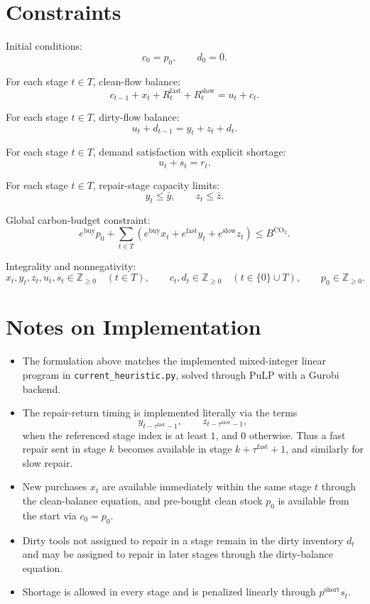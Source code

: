 \section*{Constraints}

Initial conditions:
\[
c_0 = p_0,
\qquad
d_0 = 0.
\]

For each stage $t\in T$, clean-flow balance:
\[
c_{t-1} + x_t + R^{\text{fast}}_t + R^{\text{slow}}_t = u_t + c_t.
\]

For each stage $t\in T$, dirty-flow balance:
\[
u_t + d_{t-1} = y_t + z_t + d_t.
\]

For each stage $t\in T$, demand satisfaction with explicit shortage:
\[
u_t + s_t = r_t.
\]

For each stage $t\in T$, repair-stage capacity limits:
\[
y_t \le \bar y,
\qquad
z_t \le \bar z.
\]

Global carbon-budget constraint:
\[
e^{\text{buy}} p_0
+\sum_{t\in T}\left(
e^{\text{buy}} x_t
+e^{\text{fast}} y_t
+e^{\text{slow}} z_t
\right)
\le B^{\text{CO}_2}.
\]

Integrality and nonnegativity:
\[
x_t,y_t,z_t,u_t,s_t \in \mathbb{Z}_{\ge 0}\quad (t\in T),
\qquad
c_t,d_t \in \mathbb{Z}_{\ge 0}\quad (t\in \{0\}\cup T),
\qquad
p_0\in \mathbb{Z}_{\ge 0}.
\]

\section*{Notes on Implementation}

\begin{itemize}
    \item The formulation above matches the implemented mixed-integer linear program in \texttt{current\_heuristic.py}, solved through PuLP with a Gurobi backend.
    \item The repair-return timing is implemented literally via the terms
    \[
    y_{t-\tau^{\text{fast}}-1},\qquad z_{t-\tau^{\text{slow}}-1},
    \]
    when the referenced stage index is at least $1$, and $0$ otherwise. Thus a fast repair sent in stage $k$ becomes available in stage $k+\tau^{\text{fast}}+1$, and similarly for slow repair.
    \item New purchases $x_t$ are available immediately within the same stage $t$ through the clean-balance equation, and pre-bought clean stock $p_0$ is available from the start via $c_0=p_0$.
    \item Dirty tools not assigned to repair in a stage remain in the dirty inventory $d_t$ and may be assigned to repair in later stages through the dirty-balance equation.
    \item Shortage is allowed in every stage and is penalized linearly through $p^{\text{short}} s_t$.
\end{itemize}
